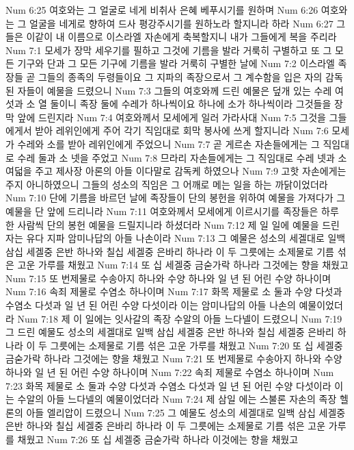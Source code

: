 Num 6:25  여호와는 그 얼굴로 네게 비취사 은혜 베푸시기를 원하며
Num 6:26  여호와는 그 얼굴을 네게로 향하여 드사 평강주시기를 원하노라 할지니라 하라
Num 6:27  그들은 이같이 내 이름으로 이스라엘 자손에게 축복할지니 내가 그들에게 복을 주리라
Num 7:1  모세가 장막 세우기를 필하고 그것에 기름을 발라 거룩히 구별하고 또 그 모든 기구와 단과 그 모든 기구에 기름을 발라 거룩히 구별한 날에
Num 7:2  이스라엘 족장들 곧 그들의 종족의 두령들이요 그 지파의 족장으로서 그 계수함을 입은 자의 감독된 자들이 예물을 드렸으니
Num 7:3  그들의 여호와께 드린 예물은 덮개 있는 수레 여섯과 소 열 둘이니 족장 둘에 수레가 하나씩이요 하나에 소가 하나씩이라 그것들을 장막 앞에 드린지라
Num 7:4  여호와께서 모세에게 일러 가라사대
Num 7:5  그것을 그들에게서 받아 레위인에게 주어 각기 직임대로 회막 봉사에 쓰게 할지니라
Num 7:6  모세가 수레와 소를 받아 레위인에게 주었으니
Num 7:7  곧 게르손 자손들에게는 그 직임대로 수레 둘과 소 넷을 주었고
Num 7:8  므라리 자손들에게는 그 직임대로 수레 넷과 소 여덟을 주고 제사장 아론의 아들 이다말로 감독케 하였으나
Num 7:9  고핫 자손에게는 주지 아니하였으니 그들의 성소의 직임은 그 어깨로 메는 일을 하는 까닭이었더라
Num 7:10  단에 기름을 바르던 날에 족장들이 단의 봉헌을 위하여 예물을 가져다가 그 예물을 단 앞에 드리니라
Num 7:11  여호와께서 모세에게 이르시기를 족장들은 하루 한 사람씩 단의 봉헌 예물을 드릴지니라 하셨더라
Num 7:12  제 일 일에 예물을 드린 자는 유다 지파 암미나답의 아들 나손이라
Num 7:13  그 예물은 성소의 세겔대로 일백 삼십 세겔중 은반 하나와 칠십 세겔중 은바리 하나라 이 두 그릇에는 소제물로 기름 섞은 고운 가루를 채웠고
Num 7:14  또 십 세겔중 금숟가락 하나라 그것에는 향을 채웠고
Num 7:15  또 번제물로 수송아지 하나와 수양 하나와 일 년 된 어린 수양 하나이며
Num 7:16  속죄 제물로 수염소 하나이며
Num 7:17  화목 제물로 소 둘과 수양 다섯과 수염소 다섯과 일 년 된 어린 수양 다섯이라 이는 암미나답의 아들 나손의 예물이었더라
Num 7:18  제 이 일에는 잇사갈의 족장 수알의 아들 느다넬이 드렸으니
Num 7:19  그 드린 예물도 성소의 세겔대로 일백 삼십 세겔중 은반 하나와 칠십 세겔중 은바리 하나라 이 두 그릇에는 소제물로 기름 섞은 고운 가루를 채웠고
Num 7:20  또 십 세겔중 금숟가락 하나라 그것에는 향을 채웠고
Num 7:21  또 번제물로 수송아지 하나와 수양 하나와 일 년 된 어린 수양 하나이며
Num 7:22  속죄 제물로 수염소 하나이며
Num 7:23  화목 제물로 소 둘과 수양 다섯과 수염소 다섯과 일 년 된 어린 수양 다섯이라 이는 수알의 아들 느다넬의 예물이었더라
Num 7:24  제 삼일 에는 스불론 자손의 족장 헬론의 아들 엘리압이 드렸으니
Num 7:25  그 예물도 성소의 세겔대로 일백 삼십 세겔중 은반 하나와 칠십 세겔중 은바리 하나라 이 두 그릇에는 소제물로 기름 섞은 고운 가루를 채웠고
Num 7:26  또 십 세겔중 금숟가락 하나라 이것에는 향을 채웠고

